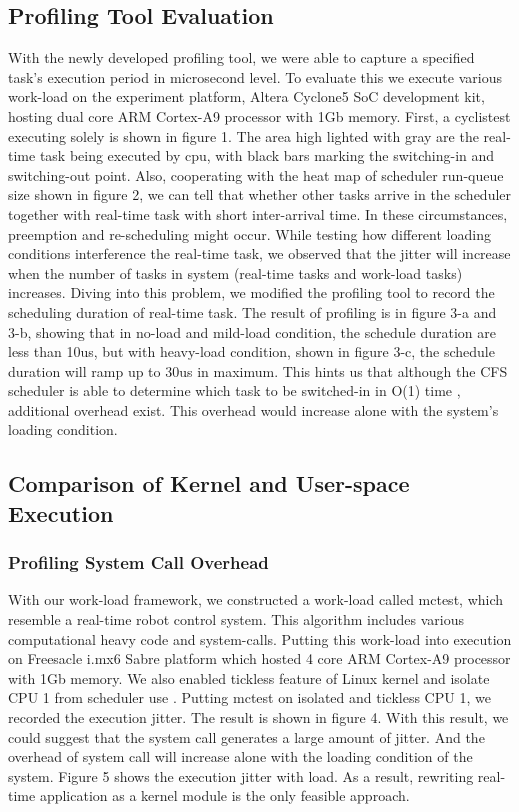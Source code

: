 \documentclass[conference]{IEEEtran}
\begin{document}
\subsection{Profiling Tool Evaluation} 
    
    With the newly developed profiling tool, we were able to capture a specified task's execution period in microsecond
    level. To evaluate this we execute various work-load on the experiment platform, Altera Cyclone5 SoC development
    kit, hosting dual core ARM Cortex-A9 processor with 1Gb memory. First, a cyclistest executing solely is shown in
    figure 1. The area high lighted with gray are the real-time task being executed by cpu, with black bars marking the
    switching-in and switching-out point. Also, cooperating with the heat map of scheduler run-queue size shown in
    figure 2, we can tell that whether other tasks arrive in the scheduler together with real-time task with short
    inter-arrival time. In these circumstances, preemption and re-scheduling might occur. While testing how different
    loading conditions interference the real-time task, we observed that the jitter will increase when the number of
    tasks in system (real-time tasks and work-load tasks) increases. Diving into this problem, we modified the profiling
    tool to record the scheduling duration of real-time task. The result of profiling is in figure 3-a and 3-b, showing
    that in no-load and mild-load condition, the schedule duration are less than 10us, but with heavy-load condition,
    shown in figure 3-c, the schedule duration will ramp up to 30us in maximum. This hints us that although the CFS
    scheduler is able to determine which task to be switched-in in O(1) time \cite{cfs}, additional overhead exist. This overhead
    would increase alone with the system's loading condition.

\subsection{Comparison of Kernel and User-space Execution}

\subsubsection{Profiling System Call Overhead}

    With our work-load framework, we constructed a work-load called mctest, which resemble a real-time robot control
    system. This algorithm includes various computational heavy code and system-calls. Putting this work-load into
    execution on Freesacle i.mx6 Sabre platform which hosted 4 core ARM Cortex-A9 processor with 1Gb memory. We also
    enabled tickless feature \cite{tickless} of Linux kernel and isolate CPU 1 from scheduler use \cite{isolatedcpu}.
    Putting mctest on isolated and tickless CPU 1, we recorded the execution jitter. The result is shown in figure 4.
    With this result, we could suggest that the system call generates a large amount of jitter. And the overhead of
    system call will increase alone with the loading condition of the system. Figure 5 shows the execution jitter with
    load. As a result, rewriting real-time application as a kernel module is the only feasible approach.
\end{document}
